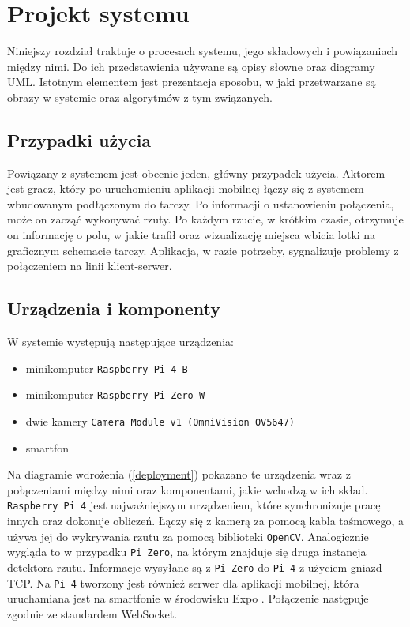 \chapter{Projekt systemu}
\thispagestyle{chapterBeginStyle}

Niniejszy rozdział traktuje o procesach systemu, jego składowych i powiązaniach między nimi. Do ich przedstawienia używane są opisy słowne oraz diagramy UML. Istotnym elementem jest prezentacja sposobu, w jaki przetwarzane są obrazy w systemie oraz algorytmów z tym związanych.

\section{Przypadki użycia}
Powiązany z systemem jest obecnie jeden, główny przypadek użycia. Aktorem jest gracz, który po uruchomieniu aplikacji mobilnej łączy się z systemem wbudowanym podłączonym do tarczy. Po informacji o ustanowieniu połączenia, może on zacząć wykonywać rzuty. Po każdym rzucie, w krótkim czasie, otrzymuje on informację o polu, w jakie trafił oraz wizualizację miejsca wbicia lotki na graficznym schemacie tarczy. Aplikacja, w razie potrzeby, sygnalizuje problemy z połączeniem na linii klient-serwer.

\section{Urządzenia i komponenty}
W systemie występują następujące urządzenia:
\begin{itemize}
  \item minikomputer \verb|Raspberry Pi 4 B|
  \item minikomputer \verb|Raspberry Pi Zero W|
  \item dwie kamery \verb|Camera Module v1 (OmniVision OV5647)|
  \item smartfon
\end{itemize}

Na diagramie wdrożenia (\ref{deployment}) pokazano te urządzenia wraz z połączeniami między nimi oraz komponentami, jakie wchodzą w ich skład. \verb|Raspberry Pi 4| jest najważniejszym urządzeniem, które synchronizuje pracę innych oraz dokonuje obliczeń. Łączy się z kamerą za pomocą kabla taśmowego, a używa jej do wykrywania rzutu za pomocą biblioteki \verb|OpenCV|. Analogicznie wygląda to w przypadku \verb|Pi Zero|, na którym znajduje się druga instancja detektora rzutu. Informacje wysyłane są z \verb|Pi Zero| do \verb|Pi 4| z użyciem gniazd TCP. Na \verb|Pi 4| tworzony jest również serwer dla aplikacji mobilnej, która uruchamiana jest na smartfonie w środowisku Expo \cite{expo}. Połączenie następuje zgodnie ze standardem WebSocket.

